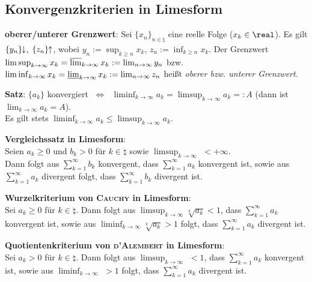 \pagebreak

\subsection{%
    Konvergenzkriterien in Limesform%
}

\textbf{oberer/unterer Grenzwert}:
Sei $\{x_n\}_{n \in \natural}$ eine reelle Folge ($x_k \in \real$).
Es gilt $\{y_n\}\!\!\downarrow$, $\{z_n\}\!\!\uparrow$, wobei
$y_n := \sup_{k \ge n} x_k$, $z_n := \inf_{k \ge n} x_k$.
Der Grenzwert $\limsup_{k \to \infty} x_k = \varlimsup_{k \to \infty} x_k
:= \lim_{n \to \infty} y_n$ bzw.
$\liminf_{k \to \infty} x_k = \varliminf_{k \to \infty} x_k
:= \lim_{n \to \infty} z_n$ heißt \emph{oberer bzw. unterer Grenzwert}.

\textbf{Satz}:
$\{a_k\}$ konvergiert $\;\Leftrightarrow\;$
$\liminf_{k \to \infty} a_k = \limsup_{k \to \infty} a_k =: A$ (dann ist
$\lim_{k \to \infty} a_k = A$). \\
Es gilt stets $\liminf_{k \to \infty} a_k \le \limsup_{k \to \infty} a_k$.

\linie

\textbf{Vergleichssatz in Limesform}: \\
Seien $a_k \ge 0$ und $b_k > 0$ für $k \in \natural$ sowie
$\limsup_{k \to \infty}$  $< +\infty$. \\
Dann folgt aus $\sum_{k=1}^\infty b_k$ konvergent, dass
$\sum_{k=1}^\infty a_k$ konvergent ist, sowie aus
$\sum_{k=1}^\infty a_k$ divergent folgt, dass
$\sum_{k=1}^\infty b_k$ divergent ist.

\textbf{Wurzelkriterium von \textsc{Cauchy} in Limesform}: \\
Sei $a_k \ge 0$ für $k \in \natural$.
Dann folgt aus $\limsup_{k \to \infty} \sqrt[k]{a_k} < 1$,
dass $\sum_{k=1}^\infty a_k$ konvergent ist, sowie aus
$\liminf_{k \to \infty} \sqrt[k]{a_k} > 1$ folgt,
dass $\sum_{k=1}^\infty a_k$ divergent ist.

\textbf{Quotientenkriterium von \textsc{d'Alembert} in Limesform}: \\
Sei $a_k > 0$ für $k \in \natural$.
Dann folgt aus $\limsup_{k \to \infty}$  $< 1$,
dass $\sum_{k=1}^\infty a_k$ konvergent ist, sowie aus
$\liminf_{k \to \infty}$  $> 1$ folgt,
dass $\sum_{k=1}^\infty a_k$ divergent ist.


